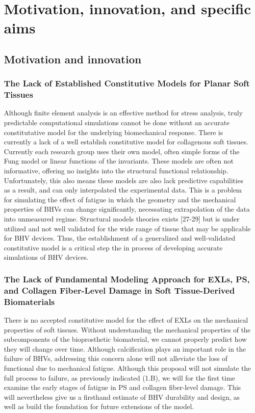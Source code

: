 \section{Motivation, innovation, and specific aims}

\subsection{Motivation and innovation}

\subsubsection{The Lack of Established Constitutive Models for Planar Soft Tissues}
    Although finite element analysis is an effective method for stress analysis, truly predictable computational simulations cannot be done without an accurate constitutative model for the underlying biomechanical response. There is currently a lack of a well establish constitutive model for collagenous soft tissues. Currently each research group uses their own model, often simple forms of the Fung model or linear functions of the invariants. These models are often not informative, offering no insights into the structural functional relationship. Unfortunately, this also means these models are also lack predictive capabilities as a result, and can only interpolated the experimental data. This is a problem for simulating the effect of fatigue in which the geometry and the mechanical properties of BHVs can change significantly, necessating extrapolation of the data into unmeasured regime. Structural models theories exists [27-29] but is under utilized and not well validated for the wide range of tissue that may be applicable for BHV devices. Thus, the establishment of a generalized and well-validated constitutive model is a critical step the in process of developing accurate simulations of BHV devices.

\subsubsection{The Lack of Fundamental Modeling Approach for EXLs, PS, and Collagen Fiber-Level Damage in Soft Tissue-Derived Biomaterials}

    There is no accepted constitutive model for the effect of EXLs on the mechanical properties of soft tissues. Without understanding the mechanical properties of the subcomponents of the bioprosthetic biomaterial, we cannot properly predict how they will change over time. Although calcification plays an important role in the failure of BHVs, addressing this concern alone will not alleviate the loss of functional due to mechanical fatigue. Although this proposal will not simulate the full process to failure, as previously indicated (1.B), we will for the first time examine the early stages of fatigue in PS and collagen fiber-level damage. This will nevertheless give us a firsthand estimate of BHV durability and design, as well as build the foundation for future extensions of the model.

